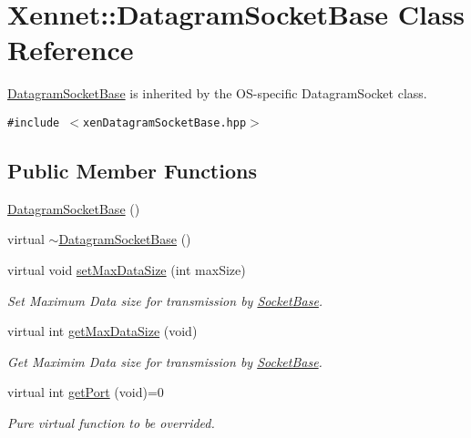 \hypertarget{classXennet_1_1DatagramSocketBase}{
\section{Xennet::DatagramSocketBase Class Reference}
\label{classXennet_1_1DatagramSocketBase}
}
\hyperlink{classXennet_1_1DatagramSocketBase}{DatagramSocketBase} is inherited by the OS-specific DatagramSocket class.  


{\tt \#include $<$xenDatagramSocketBase.hpp$>$}

\subsection*{Public Member Functions}
\begin{CompactItemize}
\item 
\hyperlink{classXennet_1_1DatagramSocketBase_11b1321a39d3b80cc80197f34da75f1f}{DatagramSocketBase} ()
\item 
virtual \hyperlink{classXennet_1_1DatagramSocketBase_b4a3902fd34b76a17452832a4d0e94a4}{$\sim$DatagramSocketBase} ()
\item 
virtual void \hyperlink{classXennet_1_1DatagramSocketBase_874f711e80bbfb068cada65f595cf67e}{setMaxDataSize} (int maxSize)
\begin{CompactList}\small\item\em Set Maximum Data size for transmission by \hyperlink{classXennet_1_1SocketBase}{SocketBase}. \item\end{CompactList}\item 
virtual int \hyperlink{classXennet_1_1DatagramSocketBase_7034b0625b0b7f62cb93804594bad713}{getMaxDataSize} (void)
\begin{CompactList}\small\item\em Get Maximim Data size for transmission by \hyperlink{classXennet_1_1SocketBase}{SocketBase}. \item\end{CompactList}\item 
virtual int \hyperlink{classXennet_1_1DatagramSocketBase_36fd9c4e4edc3d71df606ac8335150d1}{getPort} (void)=0
\begin{CompactList}\small\item\em Pure virtual function to be overrided. \item\end{CompactList}\item 

\end{CompactItemize}
